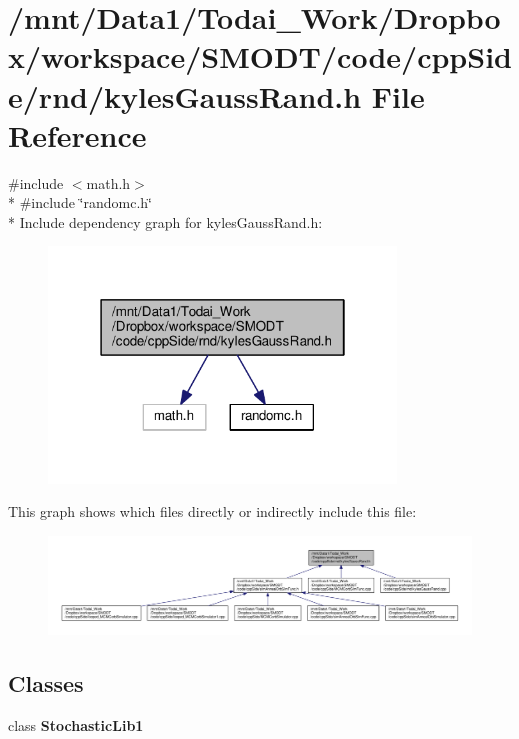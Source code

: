 \section{/mnt/\-Data1/\-Todai\-\_\-\-Work/\-Dropbox/workspace/\-S\-M\-O\-D\-T/code/cpp\-Side/rnd/kyles\-Gauss\-Rand.h File Reference}
\label{kyles_gauss_rand_8h}
{\ttfamily \#include $<$math.\-h$>$}\\*
{\ttfamily \#include \char`\"{}randomc.\-h\char`\"{}}\\*
Include dependency graph for kyles\-Gauss\-Rand.\-h\-:\nopagebreak
\begin{figure}[H]
\begin{center}
\leavevmode
\includegraphics[width=262pt]{kyles_gauss_rand_8h__incl}
\end{center}
\end{figure}
This graph shows which files directly or indirectly include this file\-:\nopagebreak
\begin{figure}[H]
\begin{center}
\leavevmode
\includegraphics[width=350pt]{kyles_gauss_rand_8h__dep__incl}
\end{center}
\end{figure}
\subsection*{Classes}
\begin{DoxyCompactItemize}
\item 
class {\bf Stochastic\-Lib1}
\end{DoxyCompactItemize}
